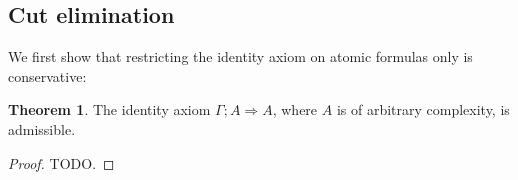 \documentclass{article}
\theoremstyle{definition}
\newtheorem{theorem}{Theorem}
\begin{document}

\subsection{Cut elimination}

We first show that restricting the identity axiom on atomic formulas
only is conservative:

\begin{theorem}
  The identity axiom $\Gamma; A \Longrightarrow A$, where $A$ is of
  arbitrary complexity, is admissible.
\end{theorem}
\begin{proof}
  TODO.
\end{proof}
\end{document}
